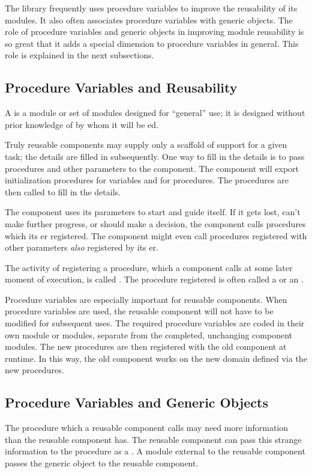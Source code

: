 The library frequently uses procedure variables to improve the reusability of
its modules.  It also often associates procedure variables with generic
objects.  The role of procedure variables and generic objects in improving
module reusability is so great that it adds a special dimension to procedure
variables in general.  This role is explained in the next subsections.

\subsection{Procedure Variables and Reusability}

A  is a module or set of modules designed
for ``general'' use; it is designed without prior knowledge of by whom 
it will be ed.

Truly reusable components may supply only a scaffold of support for a given
task; the details are filled in subsequently.  One way to fill in the details 
is
to pass procedures and other parameters to the component.  The component will
export initialization procedures for variables and  for procedures. The procedures are then called to fill in the 
details.

The component uses its parameters to start and guide itself.  If it gets lost,
can't make further progress, or should make a decision, the component calls
procedures which its er registered.  The
component might even call procedures registered with other parameters
{\em also\/} registered by its er.

The activity of registering a procedure, which a component calls at some later
moment of execution, is called .  The procedure
registered is often called a  or an .

Procedure variables are especially important for reusable components.
When procedure variables are used, the reusable component will not have to be
modified for subsequent uses.
The required procedure variables are coded in their own module or modules,
separate from the completed, unchanging component modules. 
The new procedures are then registered with the old component at runtime.  
In this way,
the old component works on the new domain defined via
the new procedures.

\subsection{Procedure Variables and Generic Objects}
The procedure which a reusable component calls may need more information
than the reusable component has.  The reusable component
can pass this strange information to the procedure as a .  A module external to the reusable component passes the generic
object to the reusable component.

